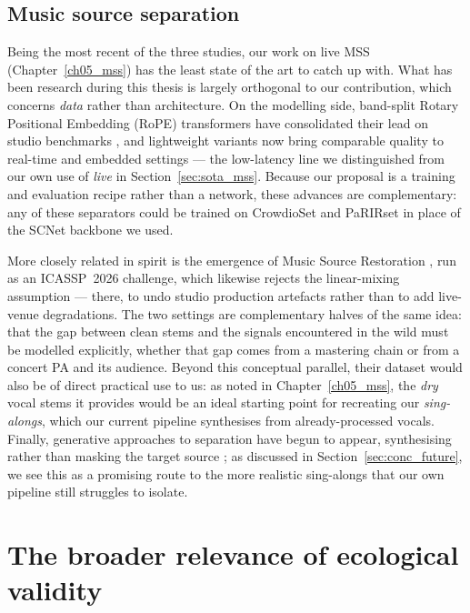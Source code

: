 \subsection{Music source separation}
\label{ssec:conc_mss}

Being the most recent of the three studies, our work on live \acrshort{MSS}
(Chapter~\ref{ch05_mss}) has the least state of the art to catch up with. What
has been research during this thesis is largely orthogonal to our contribution, which concerns
\emph{data} rather than architecture. On the modelling side, band-split
Rotary Positional Embedding (RoPE) transformers have consolidated their lead on studio benchmarks
\citep{lu2024bsroformer}, and lightweight variants now bring comparable quality
to real-time and embedded settings --- the low-latency line we distinguished from
our own use of \emph{live} in Section~\ref{sec:sota_mss}. Because our proposal is
a training and evaluation recipe rather than a network, these advances are
complementary: any of these separators could be trained on CrowdioSet and
PaRIRset in place of the SCNet backbone we used.

More closely related in spirit is the emergence of Music Source Restoration
\citep{zang2025music}, run as an \acrshort{ICASSP}~2026 challenge, which likewise
rejects the linear-mixing assumption --- there, to undo studio production
artefacts rather than to add live-venue degradations. The two settings are
complementary halves of the same idea: that the gap between clean stems and the
signals encountered in the wild must be modelled explicitly, whether that gap
comes from a mastering chain or from a concert \acrshort{PA} and its audience.
Beyond this conceptual parallel, their dataset would also be of direct practical
use to us: as noted in Chapter~\ref{ch05_mss}, the \emph{dry} vocal stems it
provides would be an ideal starting point for recreating our \emph{sing-alongs},
which our current pipeline synthesises from already-processed vocals. Finally,
generative approaches to separation have begun to appear, synthesising rather
than masking the target source \citep{plaja2025generating}; as discussed in
Section~\ref{sec:conc_future}, we see this as a promising route to the more
realistic sing-alongs that our own pipeline still struggles to isolate.

\section{The broader relevance of ecological validity}
\label{sec:conc_relevance}

